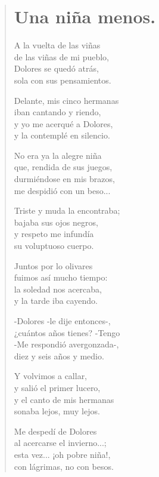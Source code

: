 \documentclass[12pt, twoside]{book}
\begin{document}
\newpage
\begin{verse}
\begin{center}
\section{Una niña menos.}
\end{center}
A la vuelta de las viñas\\
de las viñas de mi pueblo,\\
Dolores se quedó atrás,\\
sola con sus pensamientos.
\newline

Delante, mis cinco hermanas\\
iban cantando y riendo,\\
y yo me acerqué a Dolores,\\
y la contemplé en silencio.
\newline

No era ya la alegre niña\\
que, rendida de sus juegos,\\
durmiéndose en mis brazos,\\
me despidió con un beso...
\newline

Triste y muda la encontraba;\\
bajaba sus ojos negros,\\
y respeto me infundía\\
su voluptuoso cuerpo.
\newline

Juntos por lo olivares\\
fuimos así mucho tiempo:\\
la soledad nos acercaba,\\
y la tarde iba cayendo.\newline

-Dolores -le dije entonces-,\\
¿cuántos años tienes? -Tengo\\
-Me respondió avergonzada-,\\
diez y seis años y medio.
\newpage

Y volvimos a callar,\\
y salió el primer lucero,\\
y el canto de mis hermanas\\
sonaba lejos, muy lejos.
\newline

Me despedí de Dolores\\
al acercarse el invierno...;\\
esta vez... ¡oh pobre niña!,\\
con lágrimas, no con besos.
\newline


\end{verse}
\end{document}
